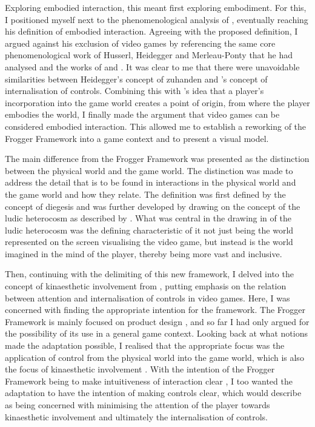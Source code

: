 Exploring embodied interaction, this meant first exploring embodiment. For this, I positioned myself next to the phenomenological analysis of , eventually reaching his definition of embodied interaction. Agreeing with the proposed definition, I argued against his exclusion of video games by referencing the same core phenomenological work of Husserl, Heidegger and Merleau-Ponty that he had analysed and the works of  and . It was clear to me that there were unavoidable similarities between Heidegger's concept of zuhanden and \citeauthor{calleja}'s \citeyear{calleja} concept of internalisation of controls. Combining this with \citeauthor{vella}'s \citeyear{vella} idea that a player's incorporation into the game world creates a point of origin, from where the player embodies the world, I finally made the argument that video games can be considered embodied interaction. This allowed me to establish a reworking of the Frogger Framework into a game context and to present a visual model.

The main difference from the Frogger Framework was presented as the distinction between the physical world and the game world. The distinction was made to address the detail that is to be found in interactions in the physical world and the game world and how they relate. The definition was first defined by the concept of diegesis \cite{bordwell} and was further developed by drawing on the concept of the ludic heterocosm as described by . What was central in the drawing in of the ludic heterocosm was the defining characteristic of it not just being the world represented on the screen visualising the video game, but instead is the world imagined in the mind of the player, thereby being more vast and inclusive.

Then, continuing with the delimiting of this new framework, I delved into the concept of kinaesthetic involvement from , putting emphasis on the relation between attention and internalisation of controls in video games. Here, I was concerned with finding the appropriate intention for the framework. The Frogger Framework is mainly focused on product design \cite{frogger}, and so far I had only argued for the possibility of its use in a general game context. Looking back at what notions made the adaptation possible, I realised that the appropriate focus was the application of control from the physical world into the game world, which is also the focus of kinaesthetic involvement \cite{calleja}. With the intention of the Frogger Framework being to make intuitiveness of interaction clear \cite{frogger}, I too wanted the adaptation to have the intention of making controls clear, which  would describe as being concerned with minimising the attention of the player towards kinaesthetic involvement and ultimately the internalisation of controls.

